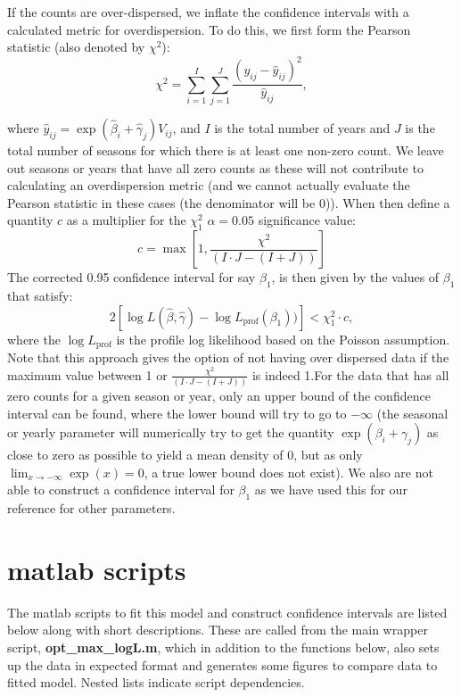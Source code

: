 \documentclass[11pt]{article}
\begin{document}
\pagebreak
If the counts are over-dispersed, we inflate the confidence intervals with a calculated metric for overdispersion. To do this, we first form the Pearson statistic (also denoted by $\chi^2$):
\[
 \chi^2 = \sum_{i=1}^{I} \sum_{j=1}^{J} \frac{(y_{ij} - \hat{y}_{ij})^2}{\hat{y}_{ij}},
\]

\noindent where $\hat{y}_{ij} = \exp(\hat{\beta}_i + \hat{\gamma}_j) V_{ij}$, and $I$ is the total number of years and $J$ is the total number of seasons for which there is at least one non-zero count. We leave out seasons or years that have all zero counts as these will not contribute to calculating an overdispersion metric (and we cannot actually evaluate the Pearson statistic in these cases (the denominator will be 0)). When then define a quantity $c$ as a multiplier for the $\chi^2_1$ $\alpha=0.05$ significance value:
\[
c = \max \left[1, \frac{\chi^2}{(I\cdot J - (I + J))}\right]
\]
The corrected 0.95 confidence interval for say $\beta_1$, is then given by the values of $\beta_1$ that satisfy:
\[
2 \left[ \log L (\hat{\beta},\hat{\gamma}) - \log L_{\text{prof}}(\beta_1)) \right] < \chi^2_1 \cdot c,
\]
where the $\log L_{\text{prof}}$ is the profile log likelihood based on the Poisson assumption.  Note that this approach gives the option of not having over dispersed data if the maximum value between 1 or $ \frac{\chi^2}{(I\cdot J - (I + J))}$ is indeed 1.For the data that has all zero counts for a given season or year, only an upper bound of the confidence interval can be found, where the lower bound will try to go to $-\infty$ (the seasonal or yearly parameter will numerically try to get the quantity $\exp(\beta_i + \gamma_j)$ as close to zero as possible to yield a mean density of 0, but as only $\lim_{x \to -\infty} \exp(x) =0$, a true lower bound does not exist). We also are not able to construct a confidence interval for $\beta_1$ as we have used this for our reference for other parameters.

 
\section{matlab scripts} 

The matlab scripts to fit this model and construct confidence intervals are listed below along with short descriptions. These are called from the main wrapper script, \textbf{opt\_max\_logL.m}, which in addition to the functions below, also sets up the data in expected format and generates some figures to compare data to fitted model. Nested lists indicate script dependencies.
\end{document}
